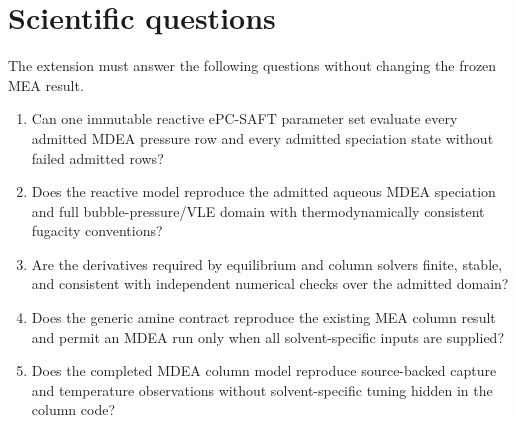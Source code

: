 \section{Scientific questions}

The extension must answer the following questions without changing the frozen MEA result.

\begin{enumerate}
  \item Can one immutable reactive ePC-SAFT parameter set evaluate every admitted MDEA
  pressure row and every admitted speciation state without failed admitted rows?
  \item Does the reactive model reproduce the admitted aqueous MDEA speciation and full
  bubble-pressure/VLE domain with thermodynamically consistent fugacity conventions?
  \item Are the derivatives required by equilibrium and column solvers finite, stable, and
  consistent with independent numerical checks over the admitted domain?
  \item Does the generic amine contract reproduce the existing MEA column result and permit
  an MDEA run only when all solvent-specific inputs are supplied?
  \item Does the completed MDEA column model reproduce source-backed capture and temperature
  observations without solvent-specific tuning hidden in the column code?
\end{enumerate}
